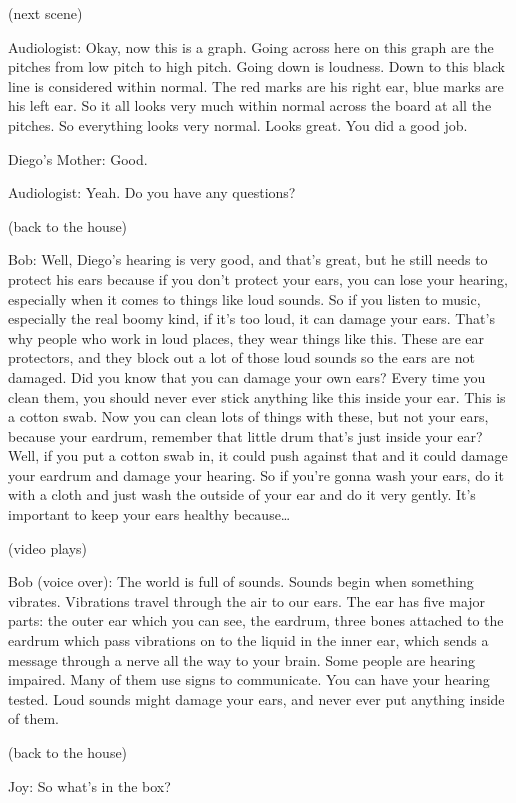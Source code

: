 (next scene)

Audiologist: Okay, now this is a graph. Going across here on this graph are the pitches from low pitch to high pitch. Going down is loudness. Down to this black line is considered within normal. The red marks are his right ear, blue marks are his left ear. So it all looks very much within normal across the board at all the pitches. So everything looks very normal. Looks great. You did a good job.

Diego's Mother: Good.

Audiologist: Yeah. Do you have any questions?

(back to the house)

Bob: Well, Diego's hearing is very good, and that's great, but he still needs to protect his ears because if you don't protect your ears, you can lose your hearing, especially when it comes to things like loud sounds. So if you listen to music, especially the real boomy kind, if it's too loud, it can damage your ears. That's why people who work in loud places, they wear things like this. These are ear protectors, and they block out a lot of those loud sounds so the ears are not damaged. Did you know that you can damage your own ears? Every time you clean them, you should never ever stick anything like this inside your ear. This is a cotton swab. Now you can clean lots of things with these, but not your ears, because your eardrum, remember that little drum that's just inside your ear? Well, if you put a cotton swab in, it could push against that and it could damage your eardrum and damage your hearing. So if you're gonna wash your ears, do it with a cloth and just wash the outside of your ear and do it very gently. It's important to keep your ears healthy because\dots

(video plays)

Bob (voice over): The world is full of sounds. Sounds begin when something vibrates. Vibrations travel through the air to our ears. The ear has five major parts: the outer ear which you can see, the eardrum, three bones attached to the eardrum which pass vibrations on to the liquid in the inner ear, which sends a message through a nerve all the way to your brain. Some people are hearing impaired. Many of them use signs to communicate. You can have your hearing tested. Loud sounds might damage your ears, and never ever put anything inside of them.

(back to the house)

Joy: So what's in the box?

